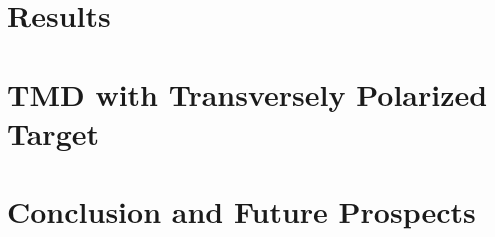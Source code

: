 \documentclass{uiucthesis2021}
\begin{document}
\chapter{Results}
\label{ch:tesult}


\chapter{TMD with Transversely Polarized Target}
\label{ch:spinquest}



\chapter{Conclusion and Future Prospects}
\label{ch:conclusion}


\backmatter

\printbibliography[heading=bibintoc,title={References}]
\end{document}
